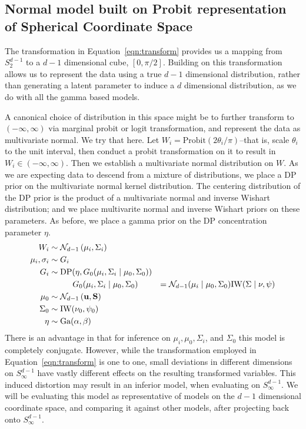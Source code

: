 
\subsection{Normal model built on Probit representation of Spherical Coordinate Space}
\label{method:npprobitnorm}
The transformation in Equation~\ref{eqn:transform} provides us a mapping from $S_{2}^{d-1}$ to a
  $d-1$ dimensional cube, $[0, \pi/2]$.  Building on this transformation allows us to represent
  the data using a true $d-1$ dimensional distribution, rather than generating a latent parameter
  to induce a $d$ dimensional distribution, as we do with all the gamma based models.

A canonical choice of distribution in this space might be to further transform to $(-\infty, \infty)$
  via marginal probit or logit transformation, and represent the data as multivariate normal.  We try
  that here.   Let $W_i = \text{Probit}(2\theta_i /\pi)$--that is, scale $\theta_i$ to the unit
  interval, then conduct a probit transformation on it to result in $W_i \in (-\infty, \infty)$.
  Then we establish a multivariate normal distribution on $W$. As we are expecting data to descend
  from a mixture of distributions, we place a DP prior on the multivariate normal kernel
  distribution.  The centering distribution of the DP prior is the product of a multivariate normal
  and inverse Wishart distribution; and we place multivarite normal and inverse Wishart priors on
  these parameters.  As before, we place a gamma prior on the DP concentration parameter $\eta$.
  \begin{equation}
    \begin{aligned}
                W_i &\sim \mathcal{N}_{d-1}\left(\mu_i, \Sigma_i\right)\\
    \mu_i, \sigma_i &\sim G_i\\
                G_i &\sim \text{DP}(\eta, G_0(\mu_i,\Sigma_i\mid\mu_0,\Sigma_0))\\
                    &\hspace{1cm}G_0(\mu_i,\Sigma_i\mid\mu_0,\Sigma_0) &=
                      \mathcal{N}_{d-1}(\mu_i\mid\mu_0,\Sigma_0)\text{IW}(\Sigma\mid\nu,\psi)\\
              \mu_0 &\sim \mathcal{N}_{d-1}\left({\bf u},{\bf S}\right)\\
           \Sigma_0 &\sim \text{IW}(\nu_0,\psi_0)\\
               \eta &\sim \text{Ga}(\alpha, \beta)
    \end{aligned}
  \end{equation}
There is an advantage in that for inference on $\mu_i, \mu_0, \Sigma_i$, and $\Sigma_0$ this model
  is completely conjugate.  However, while the transformation employed in Equation~\ref{eqn:transform}
  is one to one, small deviations in different dimensions on $S_{\infty}^{d-1}$ have vastly different
  effects on the resulting transformed variables.  This induced distortion may result in an inferior
  model, when evaluating on $S_{\infty}^{d-1}$.  We will be evaluating this model as representative
  of models on the $d-1$ dimensional coordinate space, and comparing it against other models, after
  projecting back onto $S_{\infty}^{d-1}$.

